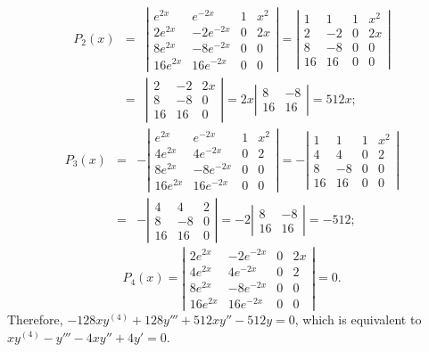 \documentclass{ximera}
\begin{document}
\begin{problem}
\begin{enumerate}
\begin{solution}
\begin{eqnarray*}
P_2(x)&=&
\left|\begin{array}{crcc}
e^{2x}&e^{-2x}&1&x^2\\
2e^{2x}&-2e^{-2x}&0&2x\\
8e^{2x}&-8e^{-2x}&0&0\\
16e^{2x}&16e^{-2x}&0&0
\end{array}\right|=
\left|\begin{array}{crcc}
1&1&1&x^2\\
2&-2&0&2x\\
8&-8&0&0\\
16&16&0&0
\end{array}\right|\\
&=&\left|\begin{array}{crcc}
2&-2&2x\\
8&-8&0\\
16&16&0
\end{array}\right|
=2x\left|\begin{array}{crcc}
8&-8\\
16&16
\end{array}\right|=512x;
\end{eqnarray*}
\begin{eqnarray*}
P_3(x)&=&
-\left|\begin{array}{cccc}
e^{2x}&e^{-2x}&1&x^2\\
4e^{2x}&4e^{-2x}&0&2\\
8e^{2x}&-8e^{-2x}&0&0\\
16e^{2x}&16e^{-2x}&0&0
\end{array}\right|=
-\left|\begin{array}{crcc}
1&1&1&x^2\\
4&4&0&2\\
8&-8&0&0\\
16&16&0&0
\end{array}\right|\\
&=&-\left|\begin{array}{crcc}
4&4&2\\
8&-8&0\\
16&16&0
\end{array}\right|
=-2\left|\begin{array}{crcc}
8&-8\\
16&16
\end{array}\right|=-512;
\end{eqnarray*}
$$
P_4(x)=
\left|\begin{array}{crcc}
2e^{2x}&-2e^{-2x}&0&2x\\
4e^{2x}&4e^{-2x}&0&2\\
8e^{2x}&-8e^{-2x}&0&0\\
16e^{2x}&16e^{-2x}&0&0
\end{array}\right|=0.
$$
Therefore,
$-128xy^{(4)}+128y'''+512xy''-512y=0$,
which is equivalent to
 $xy^{(4)}-y'''-4xy''+4y'=0$.

\end{solution}
\end{enumerate}
\end{problem}
\end{document}
